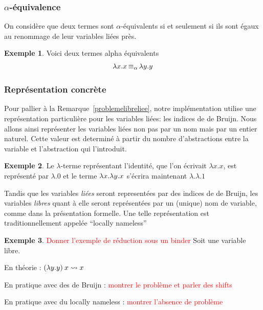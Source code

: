 \documentclass {article}
\theoremstyle{definition}
\newtheorem{example}{Exemple}
\theoremstyle{remark}
\newcommand{\todo}[1]{\textcolor{red}{#1}}
\begin{document}
\subsubsection{$\alpha$-équivalence}
\label{alpha_equiv}

\newcommand{\equivAlpha}{\mathop{\equiv_\alpha}}

On considère que deux termes sont \(\alpha\)-équivalents si et seulement si ils sont 
égaux au renommage de leur variables liées près. 
\begin{example}
  Voici deux termes alpha équivalents 
  \begin{align*}
    & \Lam{x}{\Var{x}} \equivAlpha \Lam{y}{\Var{y}} \\
  \end{align*}
\end{example}

\subsubsection{Représentation concrète}
 
Pour pallier à la Remarque~\ref{problemelibreliee}, notre implémentation utilise une représentation
particulière pour les variables liées: les indices de de Bruijn.  Nous
allons ainsi représenter les variables liées non pas par un nom mais
par un entier naturel. Cette valeur est determiné à partir du nombre
d'abstractions entre la variable et l'abstraction qui l'introduit.

\begin{example}
  Le $\lambda$-terme représentant l'identité, que l'on écrivait \(\lambda x.x\), est représenté par \(\lambda.0\)
  et le terme $\lambda x. \lambda y. x$ s'écrira maintenant $\lambda.\lambda.1$ 
\end{example}

Tandis que les variables \emph{liées} seront representées par des
indices de de Bruijn, les variables \emph{libres} quant à elle seront
représentées par un (unique) nom de variable, comme dans la
présentation formelle. Une telle représentation est traditionnellement
appelée ``locally nameless''~\citep{chargueraud:locally-nameless}

\begin{example}
  \todo{Donner l'exemple de réduction sous un binder}
  Soit  une variable libre.

  En théorie :
  \((\lambda y. y)\:x \leadsto x\)

  En pratique avec des de Bruijn : \todo{montrer le problème et parler des shifts}

  En pratique avec du locally nameless : \todo{montrer l'absence de problème}

\end{example}
\end{document}

